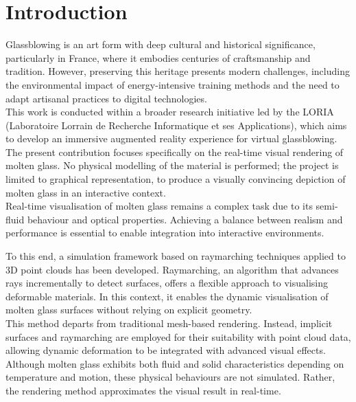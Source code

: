 \documentclass{rapportcs}
\begin{document}

\newpage

\begingroup %
\color{blue}
\renewcommand*\contentsname{Table of contents}
\tabledematieres %
\endgroup


\section{Introduction}

Glassblowing is an art form with deep cultural and historical significance, particularly in France, where it embodies centuries of craftsmanship and tradition. However, preserving this heritage presents modern challenges, including the environmental impact of energy-intensive training methods and the need to adapt artisanal practices to digital technologies. \\

\noindent This work is conducted within a broader research initiative led by the LORIA (Laboratoire Lorrain de Recherche Informatique et ses Applications), which aims to develop an immersive augmented reality experience for virtual glassblowing. The present contribution focuses specifically on the real-time visual rendering of molten glass. No physical modelling of the material is performed; the project is limited to graphical representation, to produce a visually convincing depiction of molten glass in an interactive context. \\

\noindent Real-time visualisation of molten glass remains a complex task due to its semi-fluid behaviour and optical properties. Achieving a balance between realism and performance is essential to enable integration into interactive environments.

\noindent To this end, a simulation framework based on raymarching techniques applied to 3D point clouds has been developed. Raymarching, an algorithm that advances rays incrementally to detect surfaces, offers a flexible approach to visualising deformable materials. In this context, it enables the dynamic visualisation of molten glass surfaces without relying on explicit geometry. \\

\noindent This method departs from traditional mesh-based rendering. Instead, implicit surfaces and raymarching are employed for their suitability with point cloud data, allowing dynamic deformation to be integrated with advanced visual effects. Although molten glass exhibits both fluid and solid characteristics depending on temperature and motion, these physical behaviours are not simulated. Rather, the rendering method approximates the visual result in real-time. \\
\end{document}
